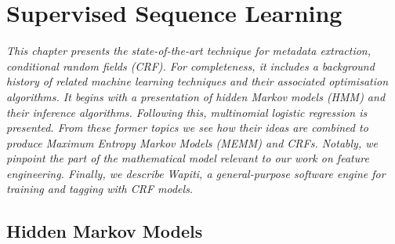 
\chapter{Supervised Sequence Learning} %

\label{Chapter2} %


\emph{This chapter presents the state-of-the-art technique for metadata extraction, conditional random fields (CRF). For completeness, it includes a background history of related machine learning techniques and their associated optimisation algorithms. It begins with a presentation of hidden Markov models (HMM) and their inference algorithms. Following this, multinomial logistic regression is presented. From these former topics we see how their ideas are combined to produce Maximum Entropy Markov Models (MEMM) and CRFs. Notably, we pinpoint the part of the mathematical model relevant to our work on feature engineering. Finally, we describe Wapiti, a general-purpose software engine for training and tagging with CRF models.}

\section{Hidden Markov Models}

